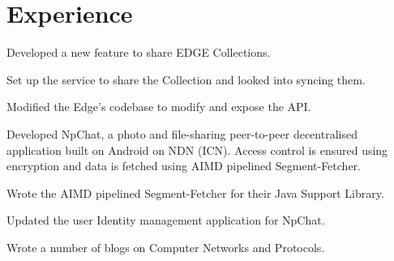 \documentclass[letterpaper]{deedy-resume} %
\begin{document}
\begin{minipage}[t]{0.66\textwidth} %


\section{Experience}


\vspace{\topsep} %
\begin{tightitemize}
\item Developed a new feature to share EDGE Collections.
\item Set up the service to share the Collection and looked into syncing them.
\item Modified the Edge's codebase to modify and expose the API.
\end{tightitemize}

\sectionspace %

\begin{tightitemize}
\item Developed NpChat, a photo and ﬁle-sharing peer-to-peer decentralised application built on Android on NDN (ICN). Access control is ensured using encryption and data is fetched using AIMD pipelined Segment-Fetcher.
\item Wrote the AIMD pipelined Segment-Fetcher for their Java Support Library.
\item Updated the user Identity management application for NpChat.
\end{tightitemize}

\sectionspace %

Wrote a number of blogs on Computer Networks and Protocols.


\sectionspace %


\end{minipage}
\end{document}
